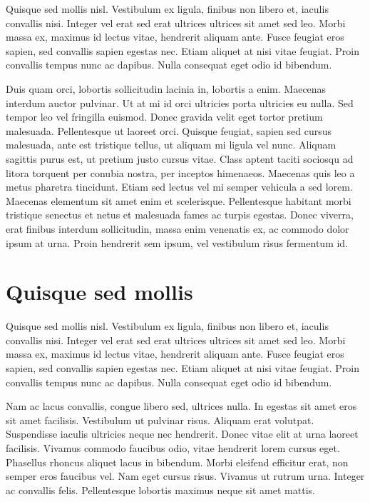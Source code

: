 \documentclass[a4paper,10pt]{book}
\begin{document}
Quisque sed mollis nisl. Vestibulum ex ligula, finibus non libero et, iaculis convallis nisi.
Integer vel erat sed erat ultrices ultrices sit amet sed leo. Morbi massa ex, maximus id lectus vitae,
hendrerit aliquam ante. Fusce feugiat eros sapien, sed convallis sapien egestas nec. Etiam aliquet at
nisi vitae feugiat. Proin convallis tempus nunc ac dapibus. Nulla consequat eget odio id bibendum.

Duis quam orci, lobortis sollicitudin lacinia in, lobortis a enim. Maecenas interdum auctor pulvinar.
Ut at mi id orci ultricies porta ultricies eu nulla. Sed tempor leo vel fringilla euismod. Donec gravida velit
eget tortor pretium malesuada. Pellentesque ut laoreet orci. Quisque feugiat, sapien sed cursus malesuada,
ante est tristique tellus, ut aliquam mi ligula vel nunc. Aliquam sagittis purus est, ut pretium justo cursus vitae.
Class aptent taciti sociosqu ad litora torquent per conubia nostra, per inceptos himenaeos.
Maecenas quis leo a metus pharetra tincidunt. Etiam sed lectus vel mi semper vehicula a sed lorem.
Maecenas elementum sit amet enim et scelerisque.
Pellentesque habitant morbi tristique senectus et netus et malesuada fames ac turpis egestas.
Donec viverra, erat finibus interdum sollicitudin, massa enim venenatis ex, ac commodo dolor ipsum at urna.
Proin hendrerit sem ipsum, vel vestibulum risus fermentum id.

\section{Quisque sed mollis}

Quisque sed mollis nisl. Vestibulum ex ligula, finibus non libero et, iaculis convallis nisi.
Integer vel erat sed erat ultrices ultrices sit amet sed leo. Morbi massa ex, maximus id lectus vitae,
hendrerit aliquam ante. Fusce feugiat eros sapien, sed convallis sapien egestas nec. Etiam aliquet at
nisi vitae feugiat. Proin convallis tempus nunc ac dapibus. Nulla consequat eget odio id bibendum.

Nam ac lacus convallis, congue libero sed, ultrices nulla. In egestas sit amet eros sit amet facilisis.
Vestibulum ut pulvinar risus. Aliquam erat volutpat. Suspendisse iaculis ultricies neque nec hendrerit.
Donec vitae elit at urna laoreet facilisis. Vivamus commodo faucibus odio, vitae hendrerit lorem cursus eget.
Phasellus rhoncus aliquet lacus in bibendum. Morbi eleifend efficitur erat, non semper eros faucibus vel.
Nam eget cursus risus. Vivamus ut rutrum urna. Integer ac convallis felis.
Pellentesque lobortis maximus neque sit amet mattis.
\end{document}
